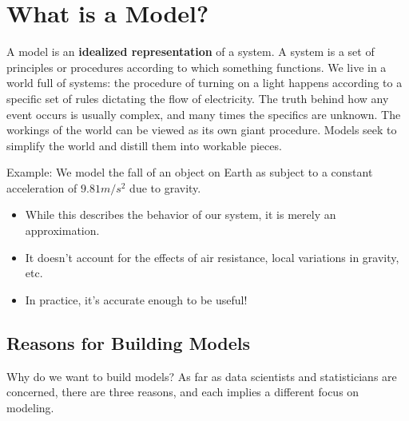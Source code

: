 \documentclass[
  letterpaper,
  DIV=11,
  numbers=noendperiod]{scrreprt}
\providecommand{\tightlist}{%
  \setlength{\itemsep}{0pt}\setlength{\parskip}{0pt}}\usepackage{longtable,booktabs,array}
\begin{document}
\section{What is a Model?}\label{what-is-a-model}

A model is an \textbf{idealized representation} of a system. A system is
a set of principles or procedures according to which something
functions. We live in a world full of systems: the procedure of turning
on a light happens according to a specific set of rules dictating the
flow of electricity. The truth behind how any event occurs is usually
complex, and many times the specifics are unknown. The workings of the
world can be viewed as its own giant procedure. Models seek to simplify
the world and distill them into workable pieces.

Example: We model the fall of an object on Earth as subject to a
constant acceleration of \(9.81 m/s^2\) due to gravity.

\begin{itemize}
\tightlist
\item
  While this describes the behavior of our system, it is merely an
  approximation.
\item
  It doesn't account for the effects of air resistance, local variations
  in gravity, etc.
\item
  In practice, it's accurate enough to be useful!
\end{itemize}

\subsection{Reasons for Building
Models}\label{reasons-for-building-models}

Why do we want to build models? As far as data scientists and
statisticians are concerned, there are three reasons, and each implies a
different focus on modeling.
\end{document}
